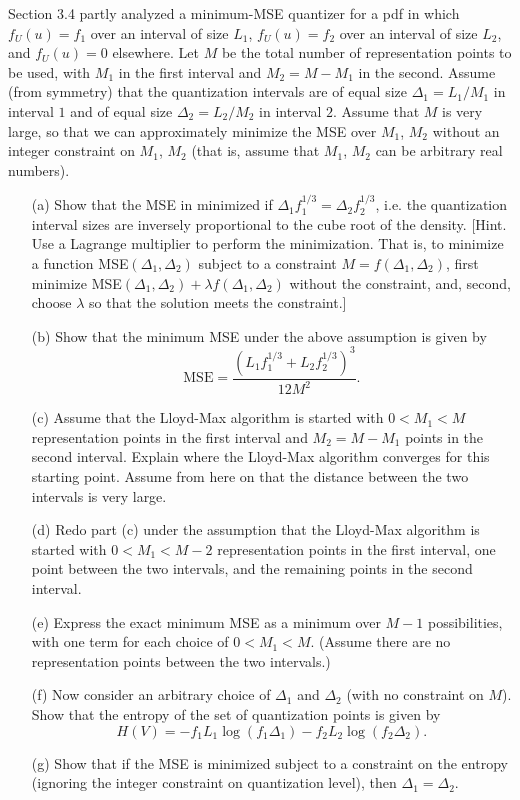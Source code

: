 \documentclass{assignment}
\begin{document}
\begin{prob}[3.4]
    Section 3.4 partly analyzed a minimum-MSE quantizer for a pdf in which $f_U(u)=f_1$ over an interval of size $L_1$, $f_U(u)=f_2$ over an interval of size $L_2$, and $f_U(u)=0$ elsewhere. Let $M$ be the total number of representation points to be used, with $M_1$ in the first interval and $M_2=M-M_1$ in the second. Assume (from symmetry) that the quantization intervals are of equal size $\Delta_1=L_1/M_1$ in interval $1$ and of equal size $\Delta_2=L_2/M_2$ in interval $2$. Assume that $M$ is very large, so that we can approximately minimize the MSE over $M_1$, $M_2$ without an integer constraint on $M_1$, $M_2$ (that is, assume that $M_1$, $M_2$ can be arbitrary real numbers).
    \begin{itemize}
        \item[(a)] Show that the MSE in minimized if $\Delta_1f_1^{1/3}=\Delta_2f_2^{1/3}$, i.e. the quantization interval sizes are inversely proportional to the cube root of the density. [Hint. Use a Lagrange multiplier to perform the minimization. That is, to minimize a function MSE$(\Delta_1,\Delta_2)$ subject to a constraint $M=f(\Delta_1,\Delta_2)$, first minimize MSE$(\Delta_1,\Delta_2)+\lambda f(\Delta_1,\Delta_2)$ without the constraint, and, second, choose $\lambda$ so that the solution meets the constraint.]
        \item[(b)] Show that the minimum MSE under the above assumption is given by
        \[
            \text{MSE}=\frac{(L_1f_1^{1/3}+L_2f_2^{1/3})^3}{12M^2}.
        \]
        \item[(c)] Assume that the Lloyd-Max algorithm is started with $0<M_1<M$ representation points in the first interval and $M_2=M-M_1$ points in the second interval. Explain where the Lloyd-Max algorithm converges for this starting point. Assume from here on that the distance between the two intervals is very large.
        \item[(d)] Redo part (c) under the assumption that the Lloyd-Max algorithm is started with $0<M_1<M-2$ representation points in the first interval, one point between the two intervals, and the remaining points in the second interval.
        \item[(e)] Express the exact minimum MSE as a minimum over $M-1$ possibilities, with one term for each choice of $0<M_1<M$. (Assume there are no representation points between the two intervals.)
        \item[(f)] Now consider an arbitrary choice of $\Delta_1$ and $\Delta_2$ (with no constraint on $M$). Show that the entropy of the set of quantization points is given by
        \[
            H(V)=-f_1L_1\log(f_1\Delta_1)-f_2L_2\log(f_2\Delta_2).
        \]
        \item[(g)] Show that if the MSE is minimized subject to a constraint on the entropy (ignoring the integer constraint on quantization level), then $\Delta_1=\Delta_2$.
    \end{itemize}
\end{prob}
\end{document}
